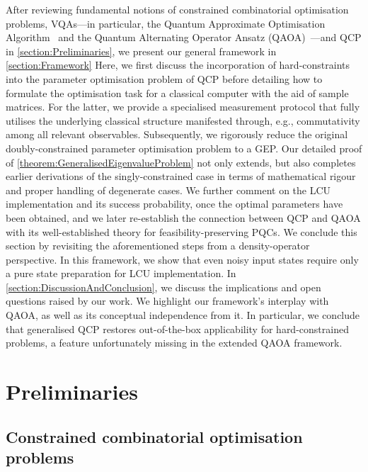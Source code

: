 \documentclass[10pt,conference]{IEEEtran}
\begin{document}
After reviewing fundamental notions of constrained combinatorial optimisation problems, VQAs---in particular, the Quantum Approximate Optimisation Algorithm~\cite{Farhi2014AQuantumApproximateOptimizationAlgorithm} and the Quantum Alternating Operator Ansatz (QAOA)~\cite{Hadfield2019FromTheQuantumApproximateOptimizationAlgorithmToAQuantumAlternatingOperatorAnsatz}---and QCP in \autoref{section:Preliminaries}, we present our general framework in \autoref{section:Framework} Here, we first discuss the incorporation of hard-constraints into the parameter optimisation problem of QCP before detailing how to formulate the optimisation task for a classical computer with the aid of sample matrices.
For the latter, we provide a specialised measurement protocol that fully utilises the underlying classical structure manifested through, e.g., commutativity among all relevant observables.
Subsequently, we rigorously reduce the original doubly-constrained parameter optimisation problem to a GEP.
Our detailed proof of \autoref{theorem:GeneralisedEigenvalueProblem} not only extends, but also completes earlier derivations of the singly-constrained case in terms of mathematical rigour and proper handling of degenerate cases.
We further comment on the LCU implementation and its success probability, once the optimal parameters have been obtained, and we later re-establish the connection between QCP and QAOA with its well-established theory for feasibility-preserving PQCs.
We conclude this section by revisiting the aforementioned steps from a density-operator perspective.
In this framework, we show that even noisy input states require only a pure state preparation for LCU implementation.
In \autoref{section:DiscussionAndConclusion}, we discuss the implications and open questions raised by our work.
We highlight our framework's interplay with QAOA, as well as its conceptual independence from it.
In particular, we conclude that generalised QCP restores out-of-the-box applicability for hard-constrained problems, a feature unfortunately missing in the extended QAOA framework.


\section{\label{section:Preliminaries}Preliminaries}

\subsection{\label{subsection:ConstrainedCombinatorialOptimisationProblems}Constrained combinatorial optimisation problems}
\end{document}
